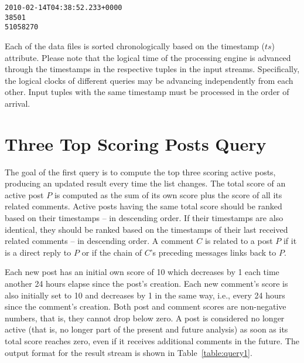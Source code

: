 \documentclass{sig-alternate}
\begin{document}
\lstset{}
\begin{lstlisting}[float=ht,caption={First line from the $comments.dat$ file -- one attribute per line of listing},label={code:like}]
2010-02-14T04:38:52.233+0000
38501
51058270
\end{lstlisting}

Each of the data files is sorted chronologically based on the timestamp ($ts$) attribute. Please note that the logical time of the processing engine is advanced through the timestamps in the respective tuples in the input streams. Specifically, the logical clocks of different queries may be advancing independently from each other. Input tuples with the same timestamp must be processed in the order of arrival.





\section{Three Top Scoring Posts Query}
\label{sec:query1}
The goal of the first query is to compute the top three scoring active posts, producing an updated result every time the list changes. The total score of an active post $P$ is computed as the sum of its own score plus the score of all its related comments. Active posts having the same total score should be ranked based on their timestamps -- in descending order. If their timestamps are also identical, they should be ranked based on the timestamps of their last received related comments -- in descending order. A comment $C$ is related to a post $P$ if it is a direct reply to $P$ or if the chain of $C$'s preceding messages links back to $P$.

Each new post has an initial own score of 10 which decreases by 1 each time another 24 hours elapse since the post's creation. Each new comment's score is also initially set to 10 and decreases by 1 in the same way, i.e., every 24 hours since the comment's creation. Both post and comment scores are non-negative numbers, that is, they cannot drop below zero. A post is considered no longer active (that is, no longer part of the present and future analysis) as soon as its total score reaches zero, even if it receives additional comments in the future. The output format for the result stream is shown in Table~\ref{table:query1}. 
\end{document}
